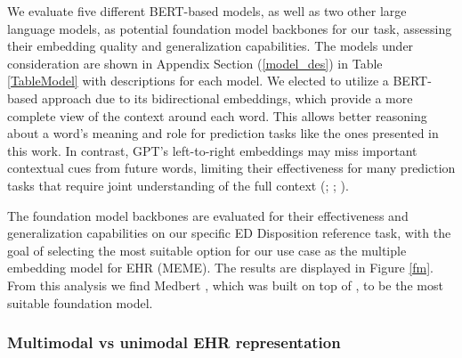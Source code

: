 \documentclass[pmlr]{jmlr}%
\begin{document}
We evaluate five different BERT-based models, as well as two other large language models, as potential foundation model backbones for our task, assessing their embedding quality and generalization capabilities. The models under consideration are shown in Appendix Section (\ref{model_des}) in Table \ref{TableModel} with descriptions for each model. We elected to utilize a BERT-based approach due to its bidirectional embeddings, which provide a more complete view of the context around each word. This allows better reasoning about a word's meaning and role for prediction tasks like the ones presented in this work. In contrast, GPT's left-to-right embeddings may miss important contextual cues from future words, limiting their effectiveness for many prediction tasks that require joint understanding of the full context (\cite{ethayarajh2019contextual}; \cite{schomacker2021language}; \cite{topal2021exploring}).

The foundation model backbones are evaluated for their effectiveness and generalization capabilities on our specific ED Disposition reference task, with the goal of selecting the most suitable option for our use case as the multiple embedding model for EHR (MEME). The results are displayed in Figure \ref{fm}. From this analysis we find Medbert \citep{9980157}, which was built on top of \citep{alsentzer2019publicly}, to be the most suitable foundation model.

\subsubsection{Multimodal vs unimodal EHR representation}
\end{document}
